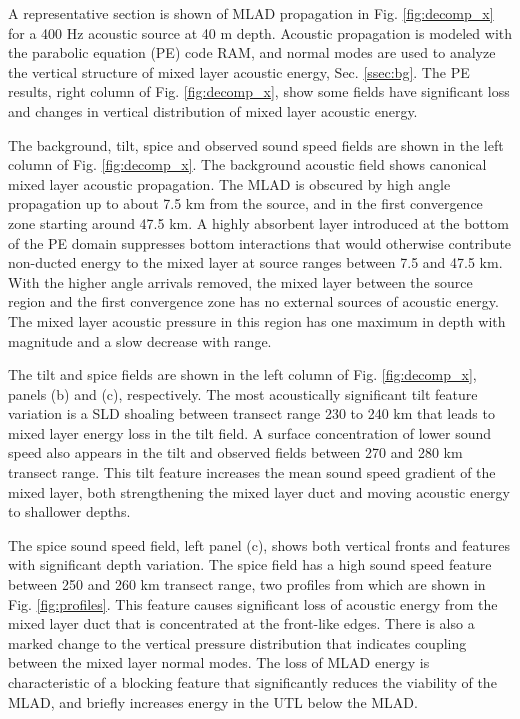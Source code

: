 \documentclass[preprint,NumberedRefs]{JASA}
\begin{document}
A representative section is shown of MLAD propagation in Fig. \ref{fig:decomp_x} for a 400 Hz acoustic source at 40 m depth. Acoustic propagation is modeled with the parabolic equation (PE) code RAM\citep{collins93}, and normal modes are used to analyze the vertical structure of mixed layer acoustic energy, Sec. \ref{ssec:bg}. The PE results, right column  of Fig. \ref{fig:decomp_x}, show some fields have significant loss and changes in vertical distribution of mixed layer acoustic energy.

The background, tilt, spice and observed sound speed fields are shown in the left column of Fig. \ref{fig:decomp_x}. The background acoustic field shows canonical mixed layer acoustic propagation. The MLAD is obscured by high angle propagation up to about 7.5 km from the source, and in the first convergence zone starting around 47.5 km. A highly absorbent layer introduced at the bottom of the PE domain suppresses bottom interactions that would otherwise contribute non-ducted energy to the mixed layer at source ranges between 7.5 and 47.5 km. With the higher angle arrivals removed, the mixed layer between the source region and the first convergence zone has no external sources of acoustic energy. The mixed layer acoustic pressure in this region has one maximum in depth with magnitude and a slow decrease with range.

The tilt and spice fields are shown in the left column of Fig. \ref{fig:decomp_x}, panels (b) and (c), respectively. The most acoustically significant tilt feature variation is a SLD shoaling between transect range 230 to 240 km that leads to mixed layer energy loss in the tilt field. A surface concentration of lower sound speed also appears in the tilt and observed fields between 270 and 280 km transect range. This tilt feature increases the mean sound speed gradient of the mixed layer, both strengthening the mixed layer duct and moving acoustic energy to shallower depths.

The spice sound speed field, left panel (c), shows both vertical fronts and features with significant depth variation. The spice field has a high sound speed feature between 250 and 260 km transect range, two profiles from which are shown in Fig. \ref{fig:profiles}. This feature causes significant loss of acoustic energy from the mixed layer duct that is concentrated at the front-like edges. There is also a marked change to the vertical pressure distribution that indicates coupling between the mixed layer normal modes. The loss of MLAD energy is characteristic of a blocking feature that significantly reduces the viability of the MLAD, and briefly increases energy in the UTL below the MLAD.
\end{document}
